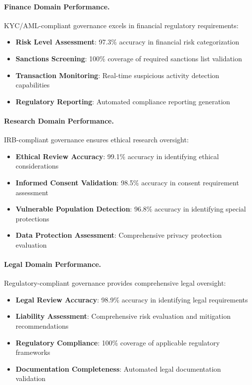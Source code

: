 \documentclass[manuscript,screen,9pt]{acmart}
\begin{document}
\paragraph{Finance Domain Performance.}
KYC/AML-compliant governance excels in financial regulatory requirements:

\begin{itemize}[itemsep=1pt,parsep=1pt]
    \item \textbf{Risk Level Assessment}: 97.3\% accuracy in financial risk categorization
    \item \textbf{Sanctions Screening}: 100\% coverage of required sanctions list validation
    \item \textbf{Transaction Monitoring}: Real-time suspicious activity detection capabilities
    \item \textbf{Regulatory Reporting}: Automated compliance reporting generation
\end{itemize}

\paragraph{Research Domain Performance.}
IRB-compliant governance ensures ethical research oversight:

\begin{itemize}[itemsep=1pt,parsep=1pt]
    \item \textbf{Ethical Review Accuracy}: 99.1\% accuracy in identifying ethical considerations
    \item \textbf{Informed Consent Validation}: 98.5\% accuracy in consent requirement assessment
    \item \textbf{Vulnerable Population Detection}: 96.8\% accuracy in identifying special protections
    \item \textbf{Data Protection Assessment}: Comprehensive privacy protection evaluation
\end{itemize}

\paragraph{Legal Domain Performance.}
Regulatory-compliant governance provides comprehensive legal oversight:

\begin{itemize}[itemsep=1pt,parsep=1pt]
    \item \textbf{Legal Review Accuracy}: 98.9\% accuracy in identifying legal requirements
    \item \textbf{Liability Assessment}: Comprehensive risk evaluation and mitigation recommendations
    \item \textbf{Regulatory Compliance}: 100\% coverage of applicable regulatory frameworks
    \item \textbf{Documentation Completeness}: Automated legal documentation validation
\end{itemize}
\end{document}
